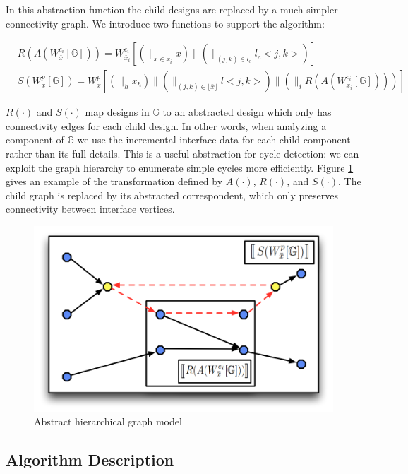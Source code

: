 In this abstraction function the child designs are replaced by a much simpler
connectivity graph.  We introduce two functions to support the algorithm:

\begin{align}
&R(A(W_{\bar{x}}^{c_i} [\mathbb{G}])) = W_{\bar{x}_i}^{c_i} [ (\parallel_{x \in \bar{x}_i} x) \parallel (\parallel_{(j,k) \in l_c} l_c<j,k> ) ] \\
&S(W_{\bar{x}}^p [\mathbb{G}]) = W_{\bar{x}}^p [ (\parallel_h x_h) \parallel
(\parallel_{(j,k) \in \lfloor \bar{x} \rfloor} l<j,k>) \parallel
(\parallel_{i} R(A(W_{\bar{x}_i}^{c_i} [\mathbb{G}]))) ] 
\end{align}

$R(\cdot)$ and $S(\cdot)$ map designs in $\mathbb{G}$ to 
an abstracted design which only has connectivity edges 
for each child design.  In other words, when analyzing a component
of $\mathbb{G}$ we use the incremental interface data for each child
component rather than its full details. This is a useful abstraction for 
cycle detection: we can exploit the graph hierarchy to 
enumerate simple cycles more efficiently.  Figure \ref{fig:abs_cycle} gives an example of the transformation defined by $A(\cdot)$, $R(\cdot)$, and $S(\cdot)$.  The child graph is replaced by its abstracted correspondent, which only preserves connectivity between interface vertices.

\begin{figure}[htb]	
    \begin{center}
    \centerline{\includegraphics[width=0.7\columnwidth]{figures/abstracted_graph.png}}
    \caption{Abstract hierarchical graph model}
    \label{fig:abs_cycle}
    \end{center}	
\end{figure}

\subsection*{Algorithm Description}

